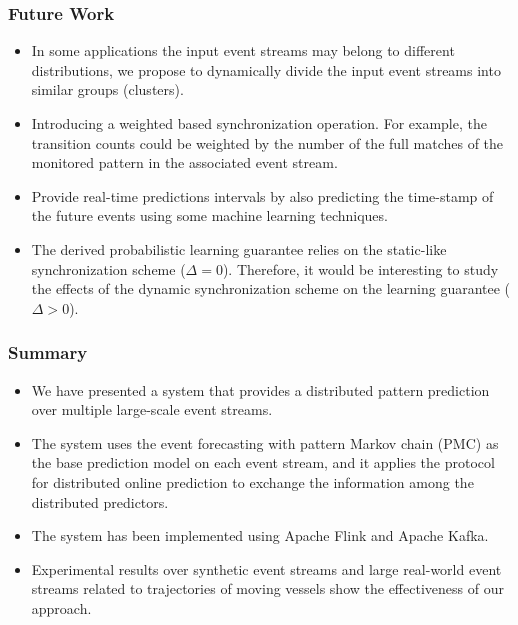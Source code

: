 \begin{frame}
	
	\frametitle{Future Work}
	\begin{itemize}
		\item<only@1> In some applications the input event streams may belong to different distributions, we propose to dynamically divide the input event streams into similar groups (clusters).
		
		\item<only@1> Introducing a weighted based synchronization operation. For example, the transition counts could be weighted by the number of the full matches of the monitored pattern in the associated event stream. 
		
		\item<only@2> Provide real-time predictions intervals by also predicting the time-stamp of the future events using some machine learning techniques.  
		
		\item<only@2>  The derived probabilistic learning guarantee  relies on the static-like synchronization scheme  ($\Delta=0$). Therefore, it would be interesting to study the effects of the dynamic synchronization scheme on the learning guarantee ($\Delta > 0$).
	\end{itemize}
	
\end{frame}

\begin{frame}
	
	\frametitle{Summary }
	\begin{itemize}
		\item<only@1> We have presented a system that provides a distributed pattern prediction over multiple large-scale event streams.
		
		\item<only@1> The system uses the event forecasting with pattern Markov chain (PMC) \cite{alevizos2017event} as the base prediction model on each event stream, and it applies the protocol for distributed online prediction \cite{kamp2014communication} to exchange the information among the distributed predictors.
		
		\item<only@2> The system has been implemented using Apache Flink and Apache Kafka.
		
		\item<only@2> Experimental results over synthetic event streams and large real-world event streams related to trajectories of moving vessels show the effectiveness of our approach.
		
	\end{itemize}
	
\end{frame}